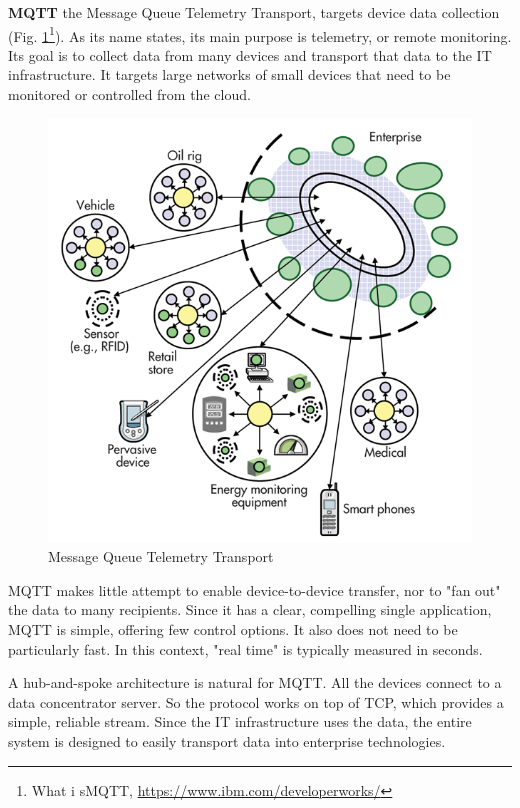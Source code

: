       \textbf{MQTT}
      \newline
      the Message Queue Telemetry Transport, targets device data collection (Fig. \ref{img:MQTT}\footnote{What i sMQTT, \url{https://www.ibm.com/developerworks/}}). As its name states, its main purpose is telemetry, or remote monitoring. Its goal is to collect data from many devices and transport that data to the IT infrastructure. It targets large networks of small devices that need to be monitored or controlled from the cloud.
      \begin{figure}[!ht]
      \centering
      \includegraphics[scale=0.6]{images/MQTT.png}   
      \caption[Message Queue Telemetry Transport]{Message Queue Telemetry Transport}
      \label{img:MQTT}                           
      \end{figure}
      MQTT makes little attempt to enable device-to-device transfer, nor to "fan out" the data to many recipients. Since it has a clear, compelling single application, MQTT is simple, offering few control options. It also does not need to be particularly fast. In this context, "real time" is typically measured in seconds.

      A hub-and-spoke architecture is natural for MQTT. All the devices connect to a data concentrator server. So the protocol works on top of TCP, which provides a simple, reliable stream. Since the IT infrastructure uses the data, the entire system is designed to easily transport data into enterprise technologies.


